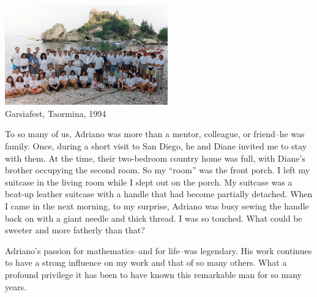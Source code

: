 \documentclass{notices}
\begin{document}
\begin{center}
 \includegraphics[height=1.7in]{Michelle_Wachs/EmbeddedImage.jpeg} 
 \\ {\footnotesize Garsiafest, Taormina, 1994}
\end{center}

To so many of us, Adriano was more than a mentor, colleague, or friend--he was family.  Once, during a short visit to San Diego, he and Diane invited me to stay with them. At the time, their two-bedroom country home  was full, with Diane's brother occupying the second room.  So my ``room'' was the front porch.   I left my suitcase in the living room while I slept out on the porch.  My suitcase was a  beat-up leather suitcase with a handle that had become partially detached.  When I came in the next morning, to my surprise, Adriano  was busy sewing the handle back on with a giant needle and thick thread. I was so touched. What could be sweeter and more fatherly than that?  

Adriano's passion for mathematics--and for life--was legendary.  His work continues to have a strong influence on my work and that of so many others.  What a profound privilege it has been to have known this remarkable man for so many years.
\end{document}
